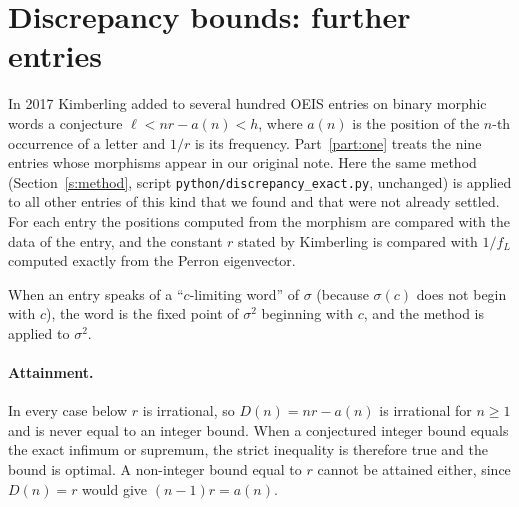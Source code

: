 \section{Discrepancy bounds: further entries}\label{s:kimb}
In 2017 Kimberling added to several hundred OEIS entries on binary morphic words a conjecture
$\ell<nr-a(n)<h$, where $a(n)$ is the position of the $n$-th occurrence of a letter and $1/r$ is its
frequency. Part~\ref{part:one} treats the nine entries whose morphisms appear in our original note. Here the
same method (Section~\ref{s:method}, script \texttt{python/discrepancy\_exact.py}, unchanged) is applied to
all other entries of this kind that we found and that were not already settled. For each entry the positions
computed from the morphism are compared with the data of the entry, and the constant $r$ stated by
Kimberling is compared with $1/f_L$ computed exactly from the Perron eigenvector.

When an entry speaks of a ``$c$-limiting word'' of $\sigma$ (because $\sigma(c)$ does not begin with $c$),
the word is the fixed point of $\sigma^2$ beginning with $c$, and the method is applied to $\sigma^2$.

\paragraph{Attainment.} In every case below $r$ is irrational, so $D(n)=nr-a(n)$ is irrational for $n\ge1$ and
is never equal to an integer bound. When a conjectured integer bound equals the exact infimum or supremum,
the strict inequality is therefore true and the bound is optimal. A non-integer bound equal to $r$ cannot be
attained either, since $D(n)=r$ would give $(n-1)r=a(n)$.

